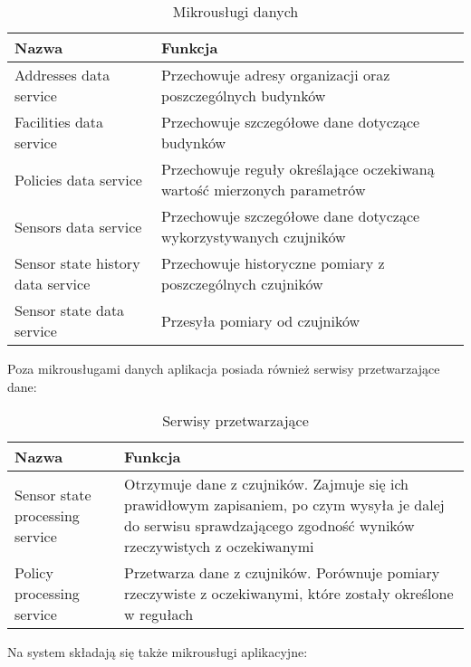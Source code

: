     \begin{xltabular}{1\textwidth} { 
        | >{\raggedright\arraybackslash}X        
        | >{\raggedright\arraybackslash}X | }
        \caption{Mikrousługi danych} \label{tab:mikrouslugi-danych} \\
        \hline
       Nazwa & Funkcja \\
       \hline
       Addresses data service & 
       Przechowuje adresy organizacji oraz poszczególnych budynków \\
       \hline
       Facilities data service &
       Przechowuje szczegółowe dane dotyczące budynków \\
       \hline
       Policies data service & 
       Przechowuje reguły określające oczekiwaną wartość mierzonych parametrów \\
       \hline
       Sensors data service &
       Przechowuje szczegółowe dane dotyczące wykorzystywanych czujników \\
       \hline
       Sensor state history data service &
       Przechowuje historyczne pomiary z poszczególnych czujników \\
       \hline
       Sensor state data service &
       Przesyła pomiary od czujników \\
       \hline
    \end{xltabular}

Poza mikrousługami danych aplikacja posiada również serwisy przetwarzające dane:

    \begin{xltabular}{1\textwidth} { 
        | >{\raggedright\arraybackslash}X        
        | >{\raggedright\arraybackslash}X | }
        \caption{Serwisy przetwarzające} \label{tab:serwisy-przetwarzajace} \\
        \hline
       Nazwa & Funkcja \\
       \hline
       Sensor state processing service & 
       Otrzymuje dane z czujników. Zajmuje się ich prawidłowym zapisaniem, po czym wysyła 
       je dalej do serwisu sprawdzającego zgodność wyników rzeczywistych z oczekiwanymi \\
       \hline
       Policy processing service &
       Przetwarza dane z czujników. Porównuje pomiary rzeczywiste z oczekiwanymi, które 
       zostały określone w regułach \\
       \hline
    \end{xltabular}

Na system składają się także mikrousługi aplikacyjne:

